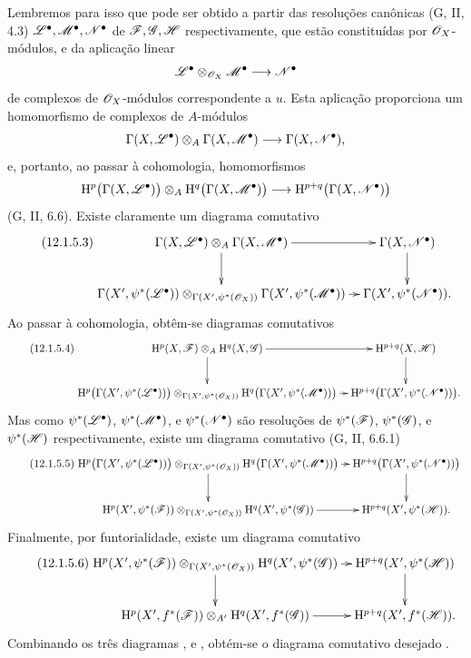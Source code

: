 \begin{env}[12.1.5]
Lembremos para isso que  pode ser obtido a partir das
resoluções canônicas (G, II, 4.3)
$\mathscr{L}^\bullet,\mathscr{M}^\bullet,\mathscr{N}^\bullet$ de
$\mathscr{F},\mathscr{G},\mathscr{H}$ respectivamente, que estão constituídas por
$\mathscr{O}_X$-módulos, e da aplicação linear
\[
  \mathscr{L}^\bullet\otimes_{\mathscr{O}_X}\mathscr{M}^\bullet
  \longrightarrow
  \mathscr{N}^\bullet
\]
de complexos de $\mathscr{O}_X$-módulos correspondente a $u$.
Esta aplicação proporciona um homomorfismo de complexos de $A$-módulos
\[
  \Gamma(X,\mathscr{L}^\bullet)\otimes_A\Gamma(X,\mathscr{M}^\bullet)
  \longrightarrow
  \Gamma(X,\mathscr{N}^\bullet),
\]
e, portanto, ao passar à cohomologia, homomorfismos
\[
  \mathrm{H}^p\bigl(\Gamma(X,\mathscr{L}^\bullet)\bigr)
  \otimes_A
  \mathrm{H}^q\bigl(\Gamma(X,\mathscr{M}^\bullet)\bigr)
  \longrightarrow
  \mathrm{H}^{p+q}\bigl(\Gamma(X,\mathscr{N}^\bullet)\bigr)
\]
(G, II, 6.6).
Existe claramente um diagrama comutativo
\[
\label{0.12.1.5.3}
\tag{12.1.5.3}
  \xymatrix@C=8pt{
    \Gamma(X,\sh{L}^\bullet)\otimes_A
      \Gamma(X,\sh{M}^\bullet)
      \ar[r]\ar[d]
      & \Gamma(X,\sh{N}^\bullet)\ar[d]\\
    \Gamma(X',\psi^*(\sh{L}^\bullet))
      \otimes_{\Gamma(X',\psi^*(\sh{O}_X))}
      \Gamma(X',\psi^*(\sh{M}^\bullet))
      \ar[r]
      & \Gamma(X',\psi^*(\sh{N}^\bullet)).
  }
\]
Ao passar à cohomologia, obtêm-se diagramas comutativos
\[
\label{0.12.1.5.4}
\tag{12.1.5.4}
  \xymatrix@C=7pt{
    \HH^p(X,\sh{F})\otimes_A\HH^q(X,\sh{G})
      \ar[r]\ar[d]
      & \HH^{p+q}(X,\sh{H})\ar[d]\\
    \HH^p\bigl(\Gamma(X',\psi^*(\sh{L}^\bullet))\bigr)
      \otimes_{\Gamma(X',\psi^*(\sh{O}_X))}
      \HH^q\bigl(\Gamma(X',\psi^*(\sh{M}^\bullet))\bigr)
      \ar[r]
      & \HH^{p+q}\bigl(\Gamma(X',\psi^*(\sh{N}^\bullet))\bigr).
  }
\]
Mas como
$\psi^*(\mathscr{L}^\bullet)$,
$\psi^*(\mathscr{M}^\bullet)$, e
$\psi^*(\mathscr{N}^\bullet)$
são resoluções de
$\psi^*(\mathscr{F})$,
$\psi^*(\mathscr{G})$, e
$\psi^*(\mathscr{H})$ respectivamente, existe um diagrama comutativo
(G, II, 6.6.1)
\[
\label{0.12.1.5.5}
\tag{12.1.5.5}
  \xymatrix@C=7pt{
    \HH^p\bigl(\Gamma(X',\psi^*(\sh{L}^\bullet))\bigr)
      \otimes_{\Gamma(X',\psi^*(\sh{O}_X))}
      \HH^q\bigl(\Gamma(X',\psi^*(\sh{M}^\bullet))\bigr)
      \ar[r]\ar[d]
      & \HH^{p+q}\bigl(\Gamma(X',\psi^*(\sh{N}^\bullet))\bigr)
        \ar[d]\\
    \HH^p(X',\psi^*(\sh{F}))
      \otimes_{\Gamma(X',\psi^*(\sh{O}_X))}
      \HH^q(X',\psi^*(\sh{G}))
      \ar[r]
      & \HH^{p+q}(X',\psi^*(\sh{H})).
  }
\]
Finalmente, por funtorialidade, existe um diagrama comutativo
\[
\label{0.12.1.5.6}
\tag{12.1.5.6}
  \xymatrix@C=7pt{
    \HH^p(X',\psi^*(\sh{F}))
      \otimes_{\Gamma(X',\psi^*(\sh{O}_X))}
      \HH^q(X',\psi^*(\sh{G}))
      \ar[r]\ar[d]
      & \HH^{p+q}(X',\psi^*(\sh{H}))\ar[d]\\
    \HH^p(X',f^*(\sh{F}))\otimes_{A'}
      \HH^q(X',f^*(\sh{G}))
      \ar[r]
      & \HH^{p+q}(X',f^*(\sh{H})).
  }
\]
Combinando os três diagramas ,
 e , obtém-se o diagrama
comutativo desejado .
\end{env}

